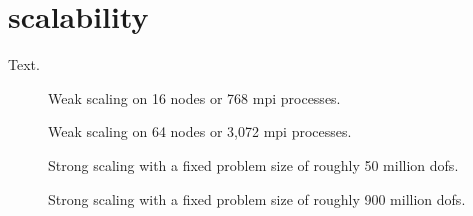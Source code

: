 \section{ scalability}
\label{sec:scaling}

Text.

\begin{figure}
\centering

\caption{Weak scaling on 16 nodes or 768 \gls{mpi} processes.}
\label{fig:weak-nodes16}
\end{figure}

\begin{figure}
\centering

\caption{Weak scaling on 64 nodes or 3,072 \gls{mpi} processes.}
\label{fig:weak-nodes64}
\end{figure}

\begin{figure}
\centering

\caption{Strong scaling with a fixed problem size of roughly 50 million \glspl{dof}.}
\label{fig:strong-nrefs10}
\end{figure}

\begin{figure}
\centering

\caption{Strong scaling with a fixed problem size of roughly 900 million \glspl{dof}.}
\label{fig:strong-nrefs12}
\end{figure}